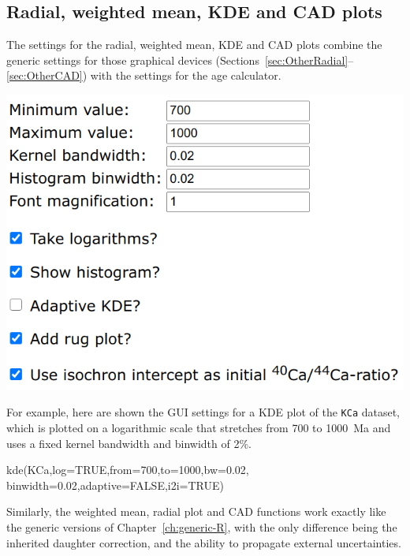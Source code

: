 \begin{refsection}
\section{Radial, weighted mean, KDE and CAD plots}
\label{sec:ArArKCaOtherPlots}

The settings for the radial, weighted mean, KDE and CAD plots combine
the generic settings for those graphical devices
(Sections~\ref{sec:OtherRadial}--\ref{sec:OtherCAD}) with the settings
for the age calculator.\\

\noindent\begin{minipage}[t]{.5\linewidth}
\strut\vspace*{-\baselineskip}\newline
\includegraphics[width=\linewidth]{../figures/KCaKDE.png}
\end{minipage}
\begin{minipage}[t]{.5\linewidth}
  For example, here are shown the GUI settings for a KDE plot of the
  \texttt{KCa} dataset, which is plotted on a logarithmic scale that
  stretches from 700 to 1000~Ma and uses a fixed kernel bandwidth and
  binwidth of 2\%.
\end{minipage}

\begin{script}
kde(KCa,log=TRUE,from=700,to=1000,bw=0.02,
    binwidth=0.02,adaptive=FALSE,i2i=TRUE)
\end{script}

Similarly, the weighted mean, radial plot and CAD functions work
exactly like the generic versions of Chapter~\ref{ch:generic-R}, with
the only difference being the inherited daughter correction, and the
ability to propagate external uncertainties.\\


\end{refsection}
